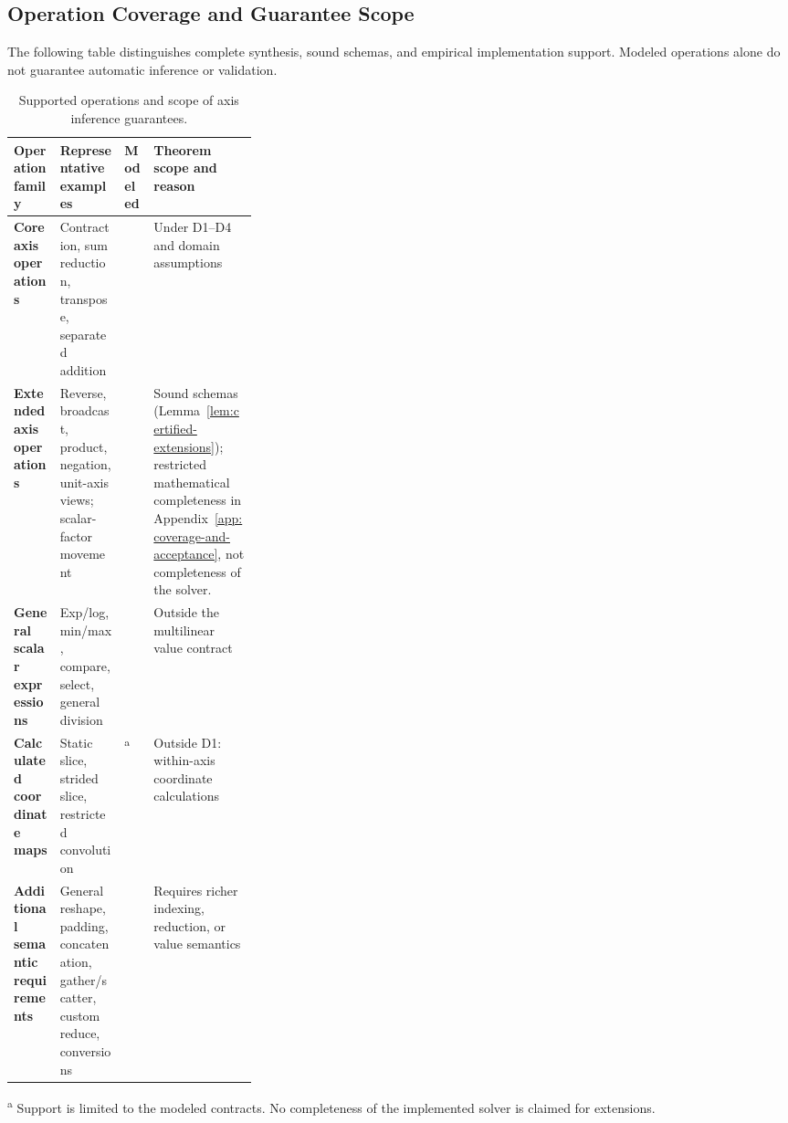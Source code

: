 \subsection{Operation Coverage and Guarantee Scope}
\label{app:operation-coverage-and-guarantee-scope}
The following table distinguishes complete synthesis, sound schemas,
and empirical implementation support. Modeled operations alone do
not guarantee automatic inference or validation.

\begin{table}[!htbp]
\caption{Supported operations and scope of axis inference guarantees.}
\label{tab:semantic-coverage}
\centering
\small
\setlength{\tabcolsep}{4pt}
\renewcommand{\arraystretch}{1}
\begin{tabularx}{\linewidth}{@{}>{\raggedright\arraybackslash}p{0.19\linewidth}Y>{\centering\arraybackslash}p{0.12\linewidth}Y@{}}\toprule
Operation family & Representative examples & Modeled & Theorem scope and reason\\[2pt]\midrule
\textbf{Core axis operations}
& Contraction, sum reduction, transpose, separated addition
& \textcolor{green!45!black}{}
& \textcolor{green!45!black}{} Under D1--D4 and domain assumptions\\
\addlinespace
\textbf{Extended axis operations}
& Reverse, broadcast, product, negation, unit-axis views; scalar-factor movement
& \textcolor{green!45!black}{}
& Sound schemas (Lemma~\ref{lem:certified-extensions}); restricted mathematical
completeness in Appendix~\ref{app:coverage-and-acceptance}, not completeness of the solver.\\
\addlinespace
\textbf{General scalar expressions}
& Exp/log, min/max, compare, select, general division
& \textcolor{green!45!black}{}
& \textcolor{red!75!black}{} Outside the multilinear value contract\\
\addlinespace
\textbf{Calculated coordinate maps}
& Static slice, strided slice, restricted convolution
& \textcolor{green!45!black}{}\textsuperscript{a}
& \textcolor{red!75!black}{} Outside D1: within-axis coordinate calculations\\
\addlinespace
\textbf{Additional semantic requirements}
& General reshape, padding, concatenation, gather/scatter, custom reduce, conversions
& \textcolor{red!75!black}{}
& \textcolor{red!75!black}{} Requires richer indexing, reduction, or value semantics\\\bottomrule
\end{tabularx}
\par\smallskip
\begin{minipage}{\linewidth}
\footnotesize
\textsuperscript{a} Support is limited to the modeled contracts.
No completeness of the implemented solver is claimed for extensions.
\end{minipage}
\end{table}
